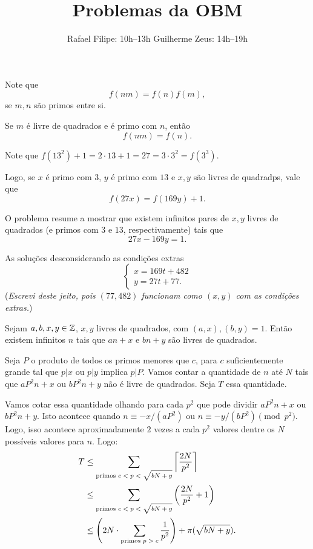 \documentclass[10pt,a4paper]{article}
\title{Problemas da OBM}
\author{Rafael Filipe: 10h--13h \quad Guilherme Zeus: 14h--19h}
\begin{document}
	
	\zeustitle


	\newpage

	\newpage

	\begin{sk}
		Note que  \[
			f(nm) = f(n)f(m),
		\]
		se $m, n$ são primos entre si.

		Se $m$ é livre de quadrados e é primo com $n$, então \[
			f(nm) = f(n).
		\]

		Note que $f(13^2) + 1 = 2 \cdot 13 + 1 = 27 = 3 \cdot 3^2 = f(3^3)$.

		Logo, se $x$ é primo com $3$, $y$ é primo com $13$ e $x, y$ são livres de quadradps, vale que  \[
			f(27x) = f(169y) + 1.
		\]

		O problema resume a mostrar que existem infinitos pares de $x, y$ livres de quadrados (e primos com $3$ e $13$, respectivamente) tais que \[27x - 169y = 1.\]

		As soluções desconsiderando as condições extras \[
			\begin{cases}
				x = 169t + 482\\
				y = 27t + 77.
			\end{cases}
		\] (\emph{Escrevi deste jeito, pois $(77, 482)$ funcionam como $(x, y)$ com as condições extras.})

		\begin{lem}
			Sejam $a, b, x, y \in \mathbb{Z}$, $x, y$ livres de quadrados, com $(a, x), (b, y) = 1$. Então existem infinitos $n$ tais que $an + x$ e $bn + y$ são livres de quadrados.
		\end{lem}
		
		\begin{dem}
			Seja $P$ o produto de todos os primos menores que $c$, para $c$ suficientemente grande tal que $p | x$ ou $p|y$ implica $p | P$.
			Vamos contar a quantidade de $n$ até $N$ tais que $aP^2n+x$ ou $bP^2n+y$ não é livre de quadrados. Seja $T$ essa quantidade.

			Vamos cotar essa quantidade olhando para cada $p^2$ que pode dividir $aP^2n + x$ ou $bP^2n + y$. Isto acontece quando  $n \equiv -x/(aP^2)$ ou  $n \equiv -y/(bP^2) \pmod{p^2}$. Logo, isso acontece aproximadamente $2$ vezes a cada $p^2$ valores dentre os $N$ possíveis valores para $n$. Logo: \begin{align*}
				T &\le \sum_{\text{primos $c < p < \sqrt{bN + y}$}}\left \lceil{\frac{2N}{p^2}}\right \rceil \\
				  &\le \sum_{\text{primos $c < p < \sqrt{bN + y}$}} \left( \frac{2N}{p^2} + 1 \right)\\
				  &\le \left(2N \cdot \sum_{\text{primos $p > c$}}\frac{1}{p^2}\right) + \pi(\sqrt{bN + y}).
			\end{align*}


\end{dem}
\end{sk}
\end{document}
